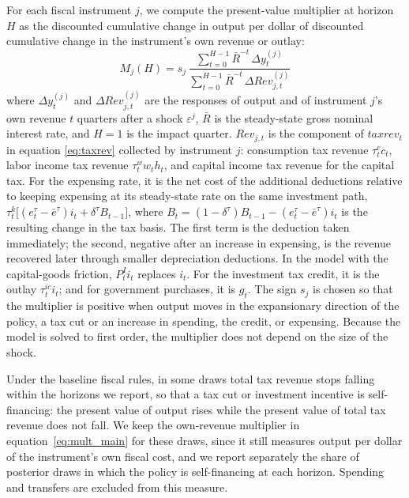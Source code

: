 \documentclass[article,11pt,letterpaper,fleqn]{article}
\theoremstyle{definition}
\numberwithin{equation}{section}
\begin{document}
For each fiscal instrument $j$, we compute the present-value multiplier at horizon $H$ as the discounted cumulative change in output per dollar of discounted cumulative change in the instrument's own revenue or outlay:
\begin{equation}\label{eq:mult_main}
M_j(H) = s_j\,\frac{\sum_{t=0}^{H-1} \bar{R}^{-t}\,\Delta y_t^{(j)}}{\sum_{t=0}^{H-1} \bar{R}^{-t}\,\Delta Rev_{j,t}^{(j)}}
\end{equation}
where $\Delta y_t^{(j)}$ and $\Delta Rev_{j,t}^{(j)}$ are the responses of output and of instrument $j$'s own revenue $t$ quarters after a shock $\varepsilon^j$, $\bar{R}$ is the steady-state gross nominal interest rate, and $H = 1$ is the impact quarter. $Rev_{j,t}$ is the component of $taxrev_t$ in equation \eqref{eq:taxrev} collected by instrument $j$: consumption tax revenue $\tau_t^c c_t$, labor income tax revenue $\tau_t^w w_t h_t$, and capital income tax revenue for the capital tax. For the expensing rate, it is the net cost of the additional deductions relative to keeping expensing at its steady-state rate on the same investment path, $\tau_t^k\bigl[(e_t^{\tau}-\bar{e}^{\tau})i_t + \delta^{\tau}B_{t-1}\bigr]$, where $B_t = (1-\delta^{\tau})B_{t-1} - (e_t^{\tau}-\bar{e}^{\tau})i_t$ is the resulting change in the tax basis. The first term is the deduction taken immediately; the second, negative after an increase in expensing, is the revenue recovered later through smaller depreciation deductions. In the model with the capital-goods friction, $P^I_t i_t$ replaces $i_t$. For the investment tax credit, it is the outlay $\tau_t^{ic} i_t$; and for government purchases, it is $g_t$. The sign $s_j$ is chosen so that the multiplier is positive when output moves in the expansionary direction of the policy, a tax cut or an increase in spending, the credit, or expensing. Because the model is solved to first order, the multiplier does not depend on the size of the shock.

Under the baseline fiscal rules, in some draws total tax revenue stops falling within the horizons we report, so that a tax cut or investment incentive is self-financing: the present value of output rises while the present value of total tax revenue does not fall. We keep the own-revenue multiplier in equation~\eqref{eq:mult_main} for these draws, since it still measures output per dollar of the instrument's own fiscal cost, and we report separately the share of posterior draws in which the policy is self-financing at each horizon. Spending and transfers are excluded from this measure.
\end{document}
